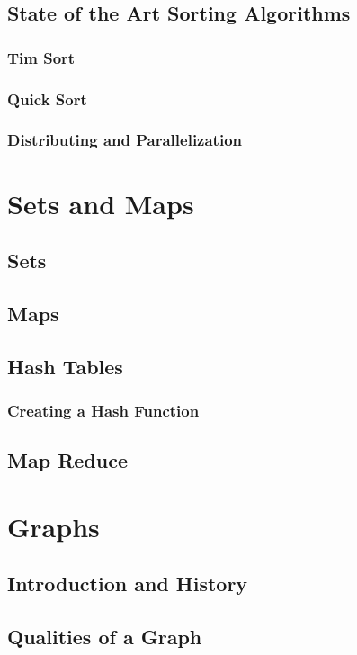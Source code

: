 \documentclass[10pt,a4paper]{book}
\begin{document}
\section{State of the Art Sorting Algorithms}

\subsection{Tim Sort}
\subsection{Quick Sort}
\subsection{Distributing and Parallelization}


\chapter{Sets and Maps}
\section{Sets}
\section{Maps}
\section{Hash Tables}
\subsection{Creating a Hash Function}
\section{Map Reduce}


\chapter{Graphs}
\section{Introduction and History}


\section{Qualities of a Graph}
\end{document}
